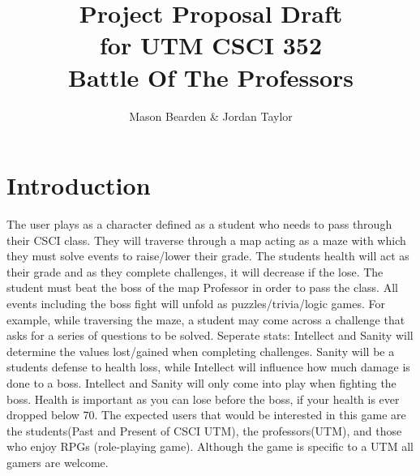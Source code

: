 \documentclass[10pt,conference,onecolumn,compsoc]{IEEEtran}
\begin{document}
\title{Project Proposal Draft\\ for UTM CSCI 352\\Battle Of The Professors}
%
%


\author{Mason Bearden & Jordan Taylor%
}



\maketitle



\IEEEdisplaynontitleabstractindextext

\IEEEpeerreviewmaketitle



\section{Introduction}



The user plays as a character defined as a student who needs to pass through their CSCI class. They will traverse through a map acting as a maze with which they must solve events to raise/lower their grade. The students health will act as their grade and as they complete challenges, it will decrease if the lose. The student must beat the boss of the map Professor in order to pass the class.
	 All events including the boss fight will unfold as puzzles/trivia/logic games. For example, while traversing the maze, a student may come across a challenge that asks for a series of questions to be solved. Seperate stats: Intellect and Sanity will determine the values lost/gained when completing challenges. Sanity will be a students defense to health loss, while Intellect will influence how much damage is done to a boss. Intellect and Sanity will only come into play when fighting the boss. Health is important as you can lose before the boss, if your health is ever dropped below 70. The expected users that would be interested in this game are the students(Past and Present of CSCI UTM), the professors(UTM), and those who enjoy RPGs (role-playing game). Although the game is specific to a UTM all gamers are welcome.
\end{document}

